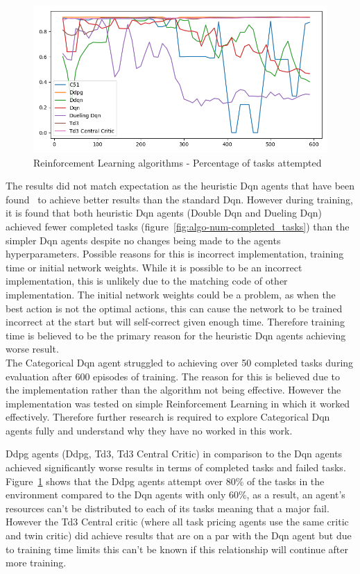 \begin{figure}[H]
    \centering
    \includegraphics[width=\linewidth]{figures/5_evaluation_figs/algo_training_fig/percent_tasks.png}
    \caption{Reinforcement Learning algorithms - Percentage of tasks attempted}
    \label{fig:algo-percent-tasks}
\end{figure}

The results did not match expectation as the heuristic Dqn agents that have been
found~\citep{doubledqn, duelingdqn, rainbow} to achieve better results than the standard Dqn. However during training,
it is found that both heuristic Dqn agents (Double Dqn and Dueling Dqn) achieved fewer completed tasks
(figure~\ref{fig:algo-num-completed_tasks}) than the simpler Dqn agents despite no changes
being made to the agents hyperparameters. Possible reasons for this is incorrect implementation,
training time or initial network weights. While it is possible to be an incorrect implementation, this is unlikely
due to the matching code of other implementation. The initial network weights could be a problem,
as when the best action is not the optimal actions, this can cause the network to be trained incorrect at the start but
will self-correct given enough time. Therefore training time is believed to be the primary reason for the heuristic Dqn
agents achieving worse result. \\
The Categorical Dqn agent struggled to achieving over 50 completed tasks during evaluation after 600 episodes of
training. The reason for this is believed due to the implementation rather than the algorithm not being effective.
However the implementation was tested on simple Reinforcement Learning in which it worked effectively. Therefore
further research is required to explore Categorical Dqn agents fully and understand why they have no worked in this
work.

Ddpg agents (Ddpg, Td3, Td3 Central Critic) in comparison to the Dqn agents achieved significantly worse results in
terms of completed tasks and failed tasks. Figure~\ref{fig:algo-percent-tasks} shows that the Ddpg agents attempt over
80\% of the tasks in the environment compared to the Dqn agents with only 60\%, as a result, an agent's resources can't
be distributed to each of its tasks meaning that a major fail. However the Td3 Central critic (where all task pricing
agents use the same critic and twin critic) did achieve results that are on a par with the Dqn agent but due to
training time limits this can't be known if this relationship will continue after more training.

